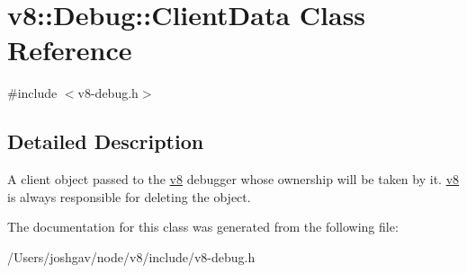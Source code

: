 \hypertarget{classv8_1_1_debug_1_1_client_data}{}\section{v8\+:\+:Debug\+:\+:Client\+Data Class Reference}
\label{classv8_1_1_debug_1_1_client_data}


{\ttfamily \#include $<$v8-\/debug.\+h$>$}



\subsection{Detailed Description}
A client object passed to the \hyperlink{namespacev8}{v8} debugger whose ownership will be taken by it. \hyperlink{namespacev8}{v8} is always responsible for deleting the object. 

The documentation for this class was generated from the following file\+:\begin{DoxyCompactItemize}
\item 
/\+Users/joshgav/node/v8/include/v8-\/debug.\+h\end{DoxyCompactItemize}
